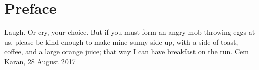 
\chapter*{Preface}

Laugh.  Or cry, your choice.  But if you must form an angry mob throwing eggs at
us, please be kind enough to make mine sunny side up, with a side of toast,
coffee, and a large orange juice; that way I can have breakfast on the run.
\newline \hspace*{\fill}Cem Karan, 28 August 2017
